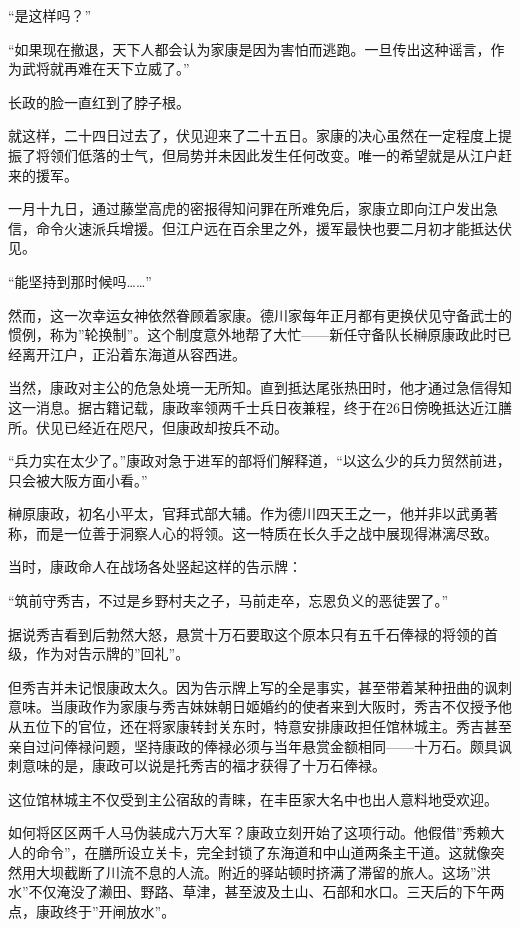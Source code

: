 \documentclass[
]{article}
\begin{document}
``是这样吗？''

``如果现在撤退，天下人都会认为家康是因为害怕而逃跑。一旦传出这种谣言，作为武将就再难在天下立威了。''

长政的脸一直红到了脖子根。

就这样，二十四日过去了，伏见迎来了二十五日。家康的决心虽然在一定程度上提振了将领们低落的士气，但局势并未因此发生任何改变。唯一的希望就是从江户赶来的援军。

一月十九日，通过藤堂高虎的密报得知问罪在所难免后，家康立即向江户发出急信，命令火速派兵增援。但江户远在百余里之外，援军最快也要二月初才能抵达伏见。

``能坚持到那时候吗\ldots\ldots{}''

然而，这一次幸运女神依然眷顾着家康。德川家每年正月都有更换伏见守备武士的惯例，称为''轮换制''。这个制度意外地帮了大忙------新任守备队长榊原康政此时已经离开江户，正沿着东海道从容西进。

当然，康政对主公的危急处境一无所知。直到抵达尾张热田时，他才通过急信得知这一消息。据古籍记载，康政率领两千士兵日夜兼程，终于在26日傍晚抵达近江膳所。伏见已经近在咫尺，但康政却按兵不动。

``兵力实在太少了。''康政对急于进军的部将们解释道，``以这么少的兵力贸然前进，只会被大阪方面小看。''

榊原康政，初名小平太，官拜式部大辅。作为德川四天王之一，他并非以武勇著称，而是一位善于洞察人心的将领。这一特质在长久手之战中展现得淋漓尽致。

当时，康政命人在战场各处竖起这样的告示牌：

``筑前守秀吉，不过是乡野村夫之子，马前走卒，忘恩负义的恶徒罢了。''

据说秀吉看到后勃然大怒，悬赏十万石要取这个原本只有五千石俸禄的将领的首级，作为对告示牌的''回礼''。

但秀吉并未记恨康政太久。因为告示牌上写的全是事实，甚至带着某种扭曲的讽刺意味。当康政作为家康与秀吉妹妹朝日姬婚约的使者来到大阪时，秀吉不仅授予他从五位下的官位，还在将家康转封关东时，特意安排康政担任馆林城主。秀吉甚至亲自过问俸禄问题，坚持康政的俸禄必须与当年悬赏金额相同------十万石。颇具讽刺意味的是，康政可以说是托秀吉的福才获得了十万石俸禄。

这位馆林城主不仅受到主公宿敌的青睐，在丰臣家大名中也出人意料地受欢迎。

如何将区区两千人马伪装成六万大军？康政立刻开始了这项行动。他假借''秀赖大人的命令''，在膳所设立关卡，完全封锁了东海道和中山道两条主干道。这就像突然用大坝截断了川流不息的人流。附近的驿站顿时挤满了滞留的旅人。这场''洪水''不仅淹没了濑田、野路、草津，甚至波及土山、石部和水口。三天后的下午两点，康政终于''开闸放水''。
\end{document}
